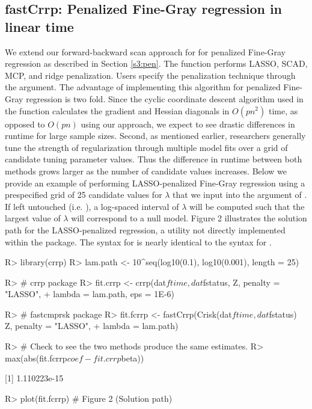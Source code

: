 \subsection{fastCrrp: Penalized Fine-Gray regression in linear time}
\label{s3:fastcrrp}
We extend our forward-backward scan approach for for penalized Fine-Gray regression as described in Section \ref{s3:pen}.  The  function performs LASSO, SCAD, MCP, and ridge \citep{hoerl1970ridge} penalization. Users specify the penalization technique through the  argument. The advantage of implementing this algorithm for penalized Fine-Gray regression is two fold. Since the cyclic coordinate descent algorithm used in the  function calculates the gradient and Hessian diagonals in $O(pn^2)$ time, as opposed to $O(pn)$ using our approach, we expect to see drastic differences in runtime for large sample sizes. Second, as mentioned earlier, researchers generally tune the strength of regularization through multiple model fits over a grid of candidate tuning parameter values. Thus the difference in runtime between both methods grows larger as the number of candidate values increases. Below we provide an example of performing LASSO-penalized Fine-Gray regression using a prespecified grid of 25 candidate values for $\lambda$ that we input into the  argument of . If left untouched (i.e. ), a log-spaced interval of $\lambda$ will be computed such that the largest value of $\lambda$ will correspond to a null model. Figure 2 illustrates the solution path for the LASSO-penalized regression, a utility not directly implemented within the  package. The syntax for  is nearly identical to the syntax for . 
\begin{example}
R> library(crrp)
R> lam.path <- 10^seq(log10(0.1), log10(0.001), length = 25)

R> # crrp package
R> fit.crrp <- crrp(dat$ftime, dat$fstatus, Z, penalty = "LASSO",
+                         lambda = lam.path, eps = 1E-6)

R> # fastcmprsk package
R> fit.fcrrp <- fastCrrp(Crisk(dat$ftime, dat$fstatus) ~ Z, penalty = "LASSO",
+                                    lambda = lam.path)


R> # Check to see the two methods produce the same estimates.
R> max(abs(fit.fcrrp$coef - fit.crrp$beta))

[1] 1.110223e-15

R> plot(fit.fcrrp) # Figure 2 (Solution path)
\end{example}

